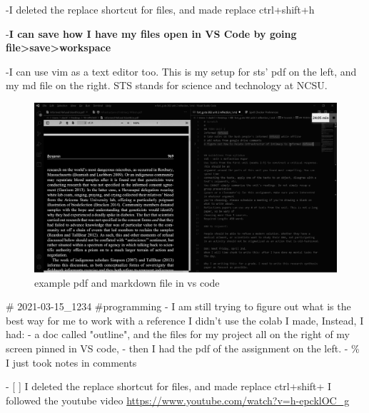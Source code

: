 -I deleted the replace shortcut for files, and made replace ctrl+shift+h

-\textbf{I can save how I have my files open in VS Code by going
file\textgreater save\textgreater workspace}

-I can use vim as a text editor too. This is my setup for sts' pdf on
the left, and my md file on the right. STS stands for science and technology at NCSU.

\begin{figure}
    \centering
    \includegraphics[width=1\linewidth]{vs code scrnsht.png}
    \caption{example pdf and markdown file in vs code}
\end{figure}
# 2021-03-15_1234
#programming
- I am still trying to figure out what is the best way for me to work with
a reference I didn't use the colab I made, Instead, I had: - a doc
called "outline", and the files for my project all on the right of my
screen pinned in VS code, - then I had the pdf of the assignment on the
left. - \% I just took notes in comments

- [ ] I deleted the replace shortcut for files, and made replace ctrl+shift+
I followed the youtube video
\url{https://www.youtube.com/watch?v=h-epcklOC_g}

